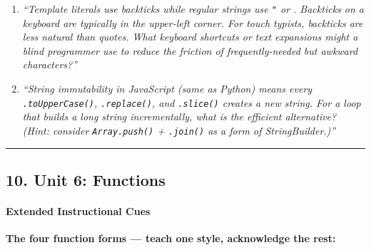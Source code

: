 \documentclass[
  justified,
  openright,
]{tufte-book}
\let\subsubsection\paragraph
\let\paragraph\paragraph
\let\subsubsection\paragraph
\let\paragraph\paragraph
\begin{document}
\begin{enumerate}
\def\labelenumi{\arabic{enumi}.}
\item
  \emph{``Template literals use backticks \texttt{\textasciigrave{}}
  while regular strings use \texttt{"} or \texttt{\textquotesingle{}}.
  Backticks on a keyboard are typically in the upper-left corner. For
  touch typists, backticks are less natural than quotes. What keyboard
  shortcuts or text expansions might a blind programmer use to reduce
  the friction of frequently-needed but awkward characters?''}
\item
  \emph{``String immutability in JavaScript (same as Python) means every
  \texttt{.toUpperCase()}, \texttt{.replace()}, and \texttt{.slice()}
  creates a new string. For a loop that builds a long string
  incrementally, what is the efficient alternative? (Hint: consider
  \texttt{Array.push()} + \texttt{.join()} as a form of
  StringBuilder.)''}
\end{enumerate}

\begin{center}\rule{0.5\linewidth}{0.5pt}\end{center}

\subsection{10. Unit 6: Functions}\label{unit-6-functions}

\subsubsection{Extended Instructional
Cues}\label{extended-instructional-cues}

\textbf{The four function forms --- teach one style, acknowledge the
rest:}
\end{document}

